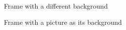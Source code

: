 \begin{frame}{Frame with a different background}
\end{frame}


\begin{frame}{Frame with a picture as its background}
\end{frame}
\usebackgroundtemplate{}

